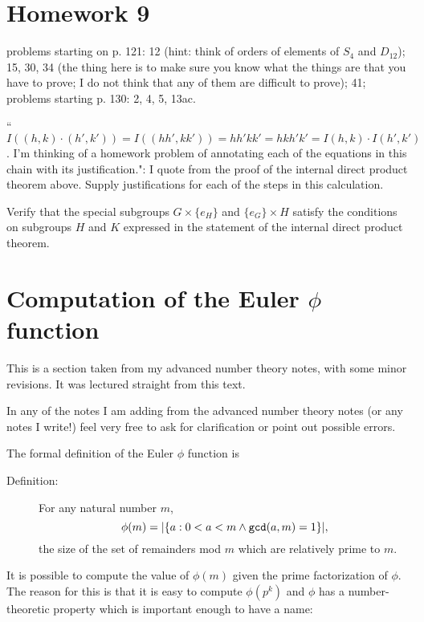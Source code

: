 \documentclass[12pt]{article}
\begin{document}
\section{Homework 9}

problems starting on p. 121:  12 (hint:  think of orders of elements of $S_4$ and $D_{12}$);  15, 30, 34 (the thing here is to make sure you know what the things are that you have to prove;  I do not think that any of them are difficult to prove);  41;  problems starting p. 130:  2, 4, 5, 13ac.   

``$I((h,k)\cdot(h',k')) = I((hh',kk')) = hh'kk' = hkh'k' = I(h,k)\cdot I(h',k')$.  I'm thinking of a homework problem of annotating each of the equations in this chain with its justification.":  I quote from the proof of the internal direct product theorem above.  Supply justifications for each of the steps in this calculation.

Verify that the special subgroups $G \times \{e_H\}$ and $\{e_G\} \times H$ satisfy the conditions on subgroups $H$ and $K$ expressed in the statement of the internal direct product theorem.

\section{Computation of the Euler $\phi$ function}

This is a section taken from my advanced number theory notes, with some minor revisions.  It was lectured straight from this text.

In any of the notes I am adding from the advanced number theory notes (or any notes I write!) feel very free to ask for clarification or point out possible errors.

The formal definition of the Euler $\phi$ function is

\begin{description}

\item[Definition:]  For any natural number $m$, $$\phi(m)=|\{a : 0<a<m \wedge {\tt gcd}(a,m)=1\}|,$$ the size of the set of remainders mod $m$ which are relatively prime to $m$.

\end{description}

It is possible to compute the value of $\phi(m)$ given the prime factorization of $\phi$.   The reason for this is that it is easy to compute $\phi(p^k)$ and $\phi$ has a number-theoretic property which is important enough to have a name:
\end{document}
